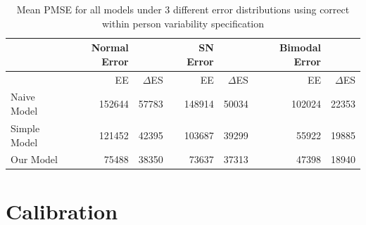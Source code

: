 \documentclass[11pt]{article}\usepackage[]{graphicx}\usepackage[]{color}
\begin{document}
% 
% 
%   
% 
% 

\begin{table}[ht]
\centering
\begin{tabular}{l|rr|rr|rr}
  \hline
 & Normal Error & & SN Error & & Bimodal Error & \\ 
  \hline
  & EE & $\Delta$ES & EE & $\Delta$ES & EE & $\Delta$ES \\
  \hline
  Naive Model & 152644 & 57783 & 148914 & 50034 & 102024 & 22353 \\
  Simple Model & 121452  & 42395 & 103687 & 39299 & 55922 & 19885 \\
  Our Model & 75488 & 38350 & 73637 & 37313 & 47398 & 18940 \\
   \hline
\end{tabular}
\caption{Mean PMSE for all models under 3 different error distributions using correct within person variability specification}
\label{pmse2}
\end{table}


\section{Calibration}
\end{document}
